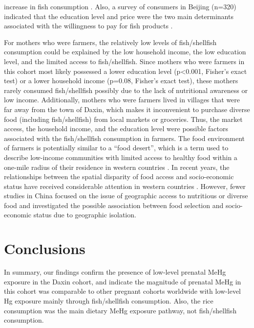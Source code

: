 increase in fish consumption \citep{zhou2015determinants}. Also, a survey of consumers in Beijing (n=320) indicated that the education level and price were the two main determinants associated with the willingness to pay for fish products \citep{wang2009consumers}.

For mothers who were farmers, the relatively low levels of fish/shellfish consumption could be explained by the low household income, the low education level, and the limited access to fish/shellfish. Since mothers who were farmers in this cohort most likely possessed a lower education level (p<0.001, Fisher's exact test) or a lower household income (p=0.08, Fisher's exact test), these mothers rarely consumed fish/shellfish possibly due to the lack of nutritional awareness or low income. Additionally, mothers who were farmers lived in villages that were far away from the town of Daxin, which makes it inconvenient to purchase diverse food (including fish/shellfish) from local markets or groceries. Thus, the market access, the household income, and the education level were possible factors associated with the fish/shellfish consumption in farmers. The food environment of farmers is potentially similar to a ``food desert'', which is a term used to describe low-income communities with limited access to healthy food within a one-mile radius of their residence in western countries \citep{cdc2016fooddeserts}. In recent years, the relationships between the spatial disparity of food access and socio-economic status have received considerable attention in western countries \citep{moore2006associations,glanz2007nutrition,powell2007food}. However, fewer studies in China focused on the issue of geographic access to nutritious or diverse food and investigated the possible association between food selection and socio-economic status due to geographic isolation.

\section{Conclusions}

In summary, our findings confirm the presence of low-level prenatal MeHg exposure in the Daxin cohort, and indicate the magnitude of prenatal MeHg in this cohort was comparable to other pregnant cohorts worldwide with low-level Hg exposure mainly through fish/shellfish consumption. Also, the rice consumption was the main dietary MeHg exposure pathway, not fish/shellfish consumption.





